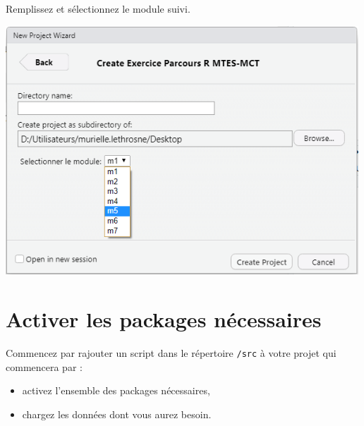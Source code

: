\documentclass[
]{book}
\begin{document}
Remplissez et sélectionnez le module suivi.

\includegraphics[width=5.20833in,height=\textheight]{pic/projetsavoirfR2.PNG}

\hypertarget{activer-les-packages-nuxe9cessaires}{%
\section{Activer les packages nécessaires}\label{activer-les-packages-nuxe9cessaires}}

Commencez par rajouter un script dans le répertoire \texttt{/src} à votre projet qui commencera par :

\begin{itemize}
\item
  activez l'ensemble des packages nécessaires,
\item
  chargez les données dont vous aurez besoin.
\end{itemize}
\end{document}
